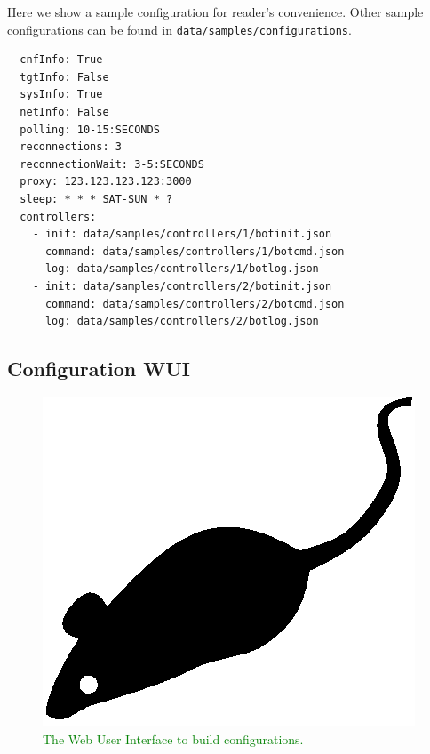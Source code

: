 Here we show a sample configuration for reader's convenience. Other sample configurations can be found in \texttt{data/samples/configurations}.

\begin{verbatim}
  cnfInfo: True
  tgtInfo: False
  sysInfo: True
  netInfo: False
  polling: 10-15:SECONDS
  reconnections: 3
  reconnectionWait: 3-5:SECONDS
  proxy: 123.123.123.123:3000
  sleep: * * * SAT-SUN * ?
  controllers:
    - init: data/samples/controllers/1/botinit.json
      command: data/samples/controllers/1/botcmd.json
      log: data/samples/controllers/1/botlog.json
    - init: data/samples/controllers/2/botinit.json
      command: data/samples/controllers/2/botcmd.json
      log: data/samples/controllers/2/botlog.json
\end{verbatim}

\subsection{Configuration WUI}
\label{sec:configuration-wui}

\textcolor{green}{\lipsum[1]}

\begin{figure}[tp]
  \centering
  \includegraphics{./fig/acmlarge-mouse}
  \caption{\textcolor{green}{The Web User Interface to build configurations.}}
    \label{fig:configuration-wui}
\end{figure}

\textcolor{green}{\lipsum[1]}
